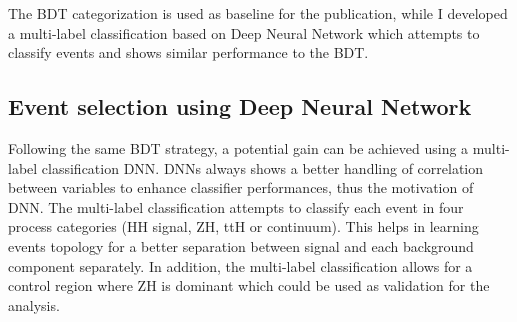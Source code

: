 The BDT categorization is used as baseline for the publication, while I developed a multi-label classification based on Deep Neural Network which attempts to classify events and shows similar performance to the BDT. 
\subsection{Event selection using Deep Neural Network}
\label{HHyybb:ObjEvt:DNN}
Following the same BDT strategy, a potential gain can be achieved using a multi-label classification DNN. DNNs always shows a better handling of correlation between variables to enhance classifier performances, thus the motivation of DNN. The multi-label classification attempts to classify each event in four process categories (HH signal, ZH, ttH or continuum). This helps in learning events topology for a better separation between signal and each background component separately. In addition, the multi-label classification allows for a control region where ZH is dominant which could be used as validation for the \HHyybb analysis. \\


